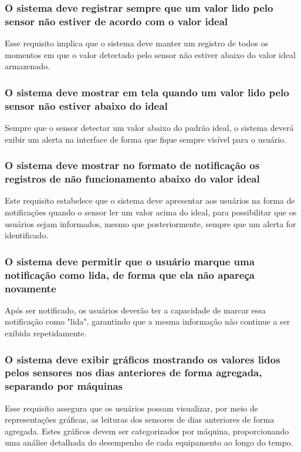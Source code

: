 \subsubsection{O sistema deve registrar sempre que um valor lido pelo sensor não estiver de acordo com o valor ideal}
Esse requisito implica que o sistema deve manter um registro de todos os momentos em que o valor detectado pelo sensor não estiver abaixo do valor ideal armazenado.

\subsubsection{O sistema deve mostrar em tela quando um valor lido pelo sensor não estiver abaixo do ideal}
Sempre que o sensor detectar um valor abaixo do padrão ideal, o sistema deverá exibir um alerta na interface de forma que fique sempre visível para o usuário.

\subsubsection{O sistema deve mostrar no formato de notificação os registros de não funcionamento abaixo do valor ideal}
Este requisito estabelece que o sistema deve apresentar aos usuários na forma de notificações quando o sensor ler um valor acima do ideal, para possibilitar que os usuários sejam informados, mesmo que posteriormente, sempre que um alerta for identificado.

\subsubsection{O sistema deve permitir que o usuário marque uma notificação como lida, de forma que ela não apareça novamente}
Após ser notificado, os usuários deverão ter a capacidade de marcar essa notificação como "lida", garantindo que a mesma informação não continue a ser exibida repetidamente.

\subsubsection{O sistema deve exibir gráficos mostrando os valores lidos pelos sensores nos dias anteriores de forma agregada, separando por máquinas}
Esse requisito assegura que os usuários possam visualizar, por meio de representações gráficas, as leituras dos sensores de dias anteriores de forma agregada. Estes gráficos devem ser categorizados por máquina, proporcionando uma análise detalhada do desempenho de cada equipamento ao longo do tempo.

